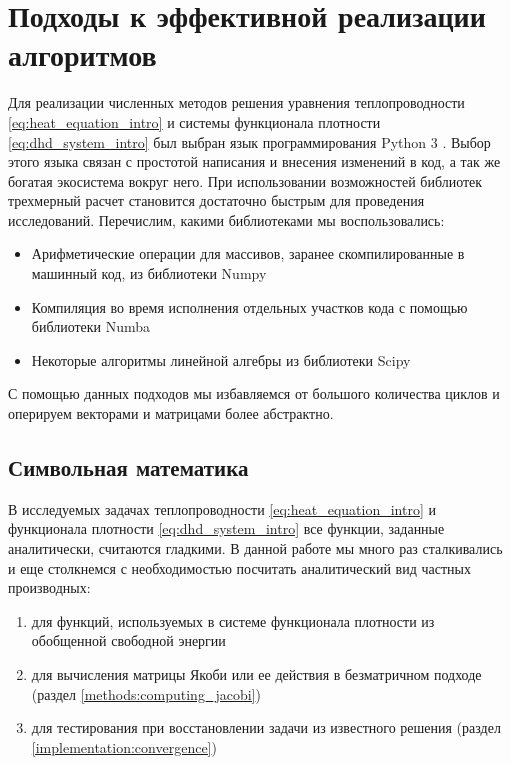 \section{Подходы к эффективной реализации алгоритмов \label{implementation}}
Для реализации численных методов решения уравнения теплопроводности \eqref{eq:heat_equation_intro} и системы функционала плотности \eqref{eq:dhd_system_intro} был выбран язык программирования Python 3 \cite{Python3}. Выбор этого языка связан с простотой написания и внесения изменений в код, а так же богатая экосистема вокруг него. При использовании возможностей библиотек трехмерный расчет становится достаточно быстрым для проведения исследований. Перечислим, какими библиотеками мы воспользовались:
\begin{itemize}
\item Арифметические операции для массивов, заранее скомпилированные в машинный код, из библиотеки Numpy \cite{Numpy}
\item Компиляция во время исполнения отдельных участков кода с помощью библиотеки Numba \cite{Numba}
\item Некоторые алгоритмы линейной алгебры из библиотеки Scipy \cite{Scipy}
\end{itemize}

С помощью данных подходов мы избавляемся от большого количества циклов и оперируем векторами и матрицами более абстрактно.

\subsection{Символьная математика \label{implementation:symbolic}}
В исследуемых задачах теплопроводности \eqref{eq:heat_equation_intro} и функционала плотности \eqref{eq:dhd_system_intro} все функции, заданные аналитически, считаются гладкими. В данной работе мы много раз сталкивались и еще столкнемся с необходимостью посчитать аналитический вид частных производных:
\begin{enumerate}
    \item для функций, используемых в системе функционала плотности из обобщенной свободной энергии
    \item для вычисления матрицы Якоби или ее действия в безматричном подходе (раздел \ref{methods:computing_jacobi})
    \item для тестирования при восстановлении задачи из известного решения (раздел \ref{implementation:convergence})
\end{enumerate}

